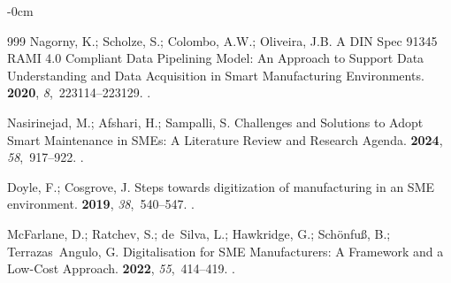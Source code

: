 \documentclass[systems,article,accept,pdftex,moreauthors]{Definitions/mdpi}
\begin{document}
\begin{adjustwidth}{-\extralength}{0cm}
\begin{thebibliography}{999}
Nagorny, K.; Scholze, S.; Colombo, A.W.; Oliveira, J.B.
\newblock A DIN Spec 91345 RAMI 4.0 Compliant Data Pipelining Model: An
  Approach to Support Data Understanding and Data Acquisition in Smart
  Manufacturing Environments.
 {\bf 2020}, {\em 8},~223114--223129.
.

Nasirinejad, M.; Afshari, H.; Sampalli, S.
\newblock Challenges and Solutions to Adopt Smart Maintenance in SMEs: A
  Literature Review and Research Agenda.
 {\bf 2024}, {\em 58},~917--922.
.

Doyle, F.; Cosgrove, J.
\newblock Steps towards digitization of manufacturing in an SME environment.
 {\bf 2019}, {\em 38},~540--547.
.

McFarlane, D.; Ratchev, S.; de~Silva, L.; Hawkridge, G.; Sch{\"o}nfu{\ss}, B.;
  Terrazas~Angulo, G.
\newblock Digitalisation for SME Manufacturers: A Framework and a Low-Cost
  Approach.
 {\bf 2022}, {\em 55},~414--419.
.

\end{thebibliography}



%


\PublishersNote{}
\end{adjustwidth}
\end{document}
